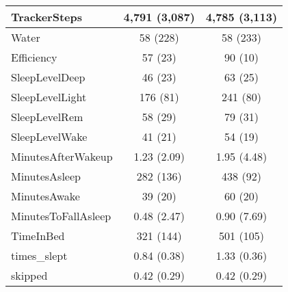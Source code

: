 \begin{tabular}{l|c|c}
\hline
TrackerSteps & 4,791 (3,087) & 4,785 (3,113)\\
\hline
Water & 58 (228) & 58 (233)\\
\hline
Efficiency & 57 (23) & 90 (10)\\
\hline
SleepLevelDeep & 46 (23) & 63 (25)\\
\hline
SleepLevelLight & 176 (81) & 241 (80)\\
\hline
SleepLevelRem & 58 (29) & 79 (31)\\
\hline
SleepLevelWake & 41 (21) & 54 (19)\\
\hline
MinutesAfterWakeup & 1.23 (2.09) & 1.95 (4.48)\\
\hline
MinutesAsleep & 282 (136) & 438 (92)\\
\hline
MinutesAwake & 39 (20) & 60 (20)\\
\hline
MinutesToFallAsleep & 0.48 (2.47) & 0.90 (7.69)\\
\hline
TimeInBed & 321 (144) & 501 (105)\\
\hline
times\_slept & 0.84 (0.38) & 1.33 (0.36)\\
\hline
skipped & 0.42 (0.29) & 0.42 (0.29)\\
\hline
\end{tabular}
